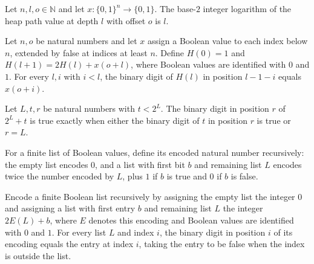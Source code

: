 \begin{theorem}
\label{BoolCircuit.Lupanov.log_heapPath}
\leanok
{}
Let $n,l,o\in\mathbb{N}$ and let $x:\{0,1\}^n\to\{0,1\}$. The base-$2$ integer logarithm
of the heap path value at depth $l$ with offset $o$ is $l$.
\end{theorem}

\begin{theorem}
\label{BoolCircuit.Lupanov.testBit_heapPath}
\leanok
{}
Let $n,o$ be natural numbers and let $x$ assign a Boolean value to each index below $n$,
extended by false at indices at least $n$. Define $H(0)=1$ and $H(l+1)=2H(l)+x(o+l)$,
where Boolean values are identified with $0$ and $1$. For every $l,i$ with $i<l$, the
binary digit of $H(l)$ in position $l-1-i$ equals $x(o+i)$.
\end{theorem}

\begin{theorem}
\label{BoolCircuit.Lupanov.testBit_two_pow_add_of_lt}
\leanok
{}
Let $L,t,r$ be natural numbers with $t<2^L$. The binary digit in position $r$ of $2^L+t$
is true exactly when either the binary digit of $t$ in position $r$ is true or $r=L$.
\end{theorem}

\begin{definition}
\label{BoolCircuit.Lupanov.ofBits}
\leanok
For a finite list of Boolean values, define its encoded natural number recursively: the
empty list encodes $0$, and a list with first bit $b$ and remaining list $L$ encodes
twice the number encoded by $L$, plus $1$ if $b$ is true and $0$ if $b$ is false.
\end{definition}

\begin{theorem}
\label{BoolCircuit.Lupanov.testBit_ofBits}
\leanok
{}
Encode a finite Boolean list recursively by assigning the empty list the integer $0$ and
assigning a list with first entry $b$ and remaining list $L$ the integer $2E(L)+b$,
where $E$ denotes this encoding and Boolean values are identified with $0$ and $1$. For
every list $L$ and index $i$, the binary digit in position $i$ of its encoding equals
the entry at index $i$, taking the entry to be false when the index is outside the list.
\end{theorem}

